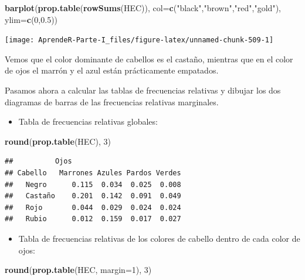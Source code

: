\documentclass[]{book}
\newenvironment{Shaded}{\begin{snugshade}}{\end{snugshade}}
\newcommand{\DataTypeTok}[1]{\textcolor[rgb]{0.13,0.29,0.53}{#1}}
\newcommand{\DecValTok}[1]{\textcolor[rgb]{0.00,0.00,0.81}{#1}}
\newcommand{\FloatTok}[1]{\textcolor[rgb]{0.00,0.00,0.81}{#1}}
\newcommand{\KeywordTok}[1]{\textcolor[rgb]{0.13,0.29,0.53}{\textbf{#1}}}
\newcommand{\NormalTok}[1]{#1}
\newcommand{\StringTok}[1]{\textcolor[rgb]{0.31,0.60,0.02}{#1}}
\providecommand{\tightlist}{%
  \setlength{\itemsep}{0pt}\setlength{\parskip}{0pt}}
\theoremstyle{definition}
\theoremstyle{definition}
\theoremstyle{definition}
\theoremstyle{remark}
\begin{document}
\begin{Shaded}
\begin{Highlighting}[]
\KeywordTok{barplot}\NormalTok{(}\KeywordTok{prop.table}\NormalTok{(}\KeywordTok{rowSums}\NormalTok{(HEC)),}
  \DataTypeTok{col=}\KeywordTok{c}\NormalTok{(}\StringTok{"black"}\NormalTok{,}\StringTok{"brown"}\NormalTok{,}\StringTok{"red"}\NormalTok{,}\StringTok{"gold"}\NormalTok{), }\DataTypeTok{ylim=}\KeywordTok{c}\NormalTok{(}\DecValTok{0}\NormalTok{,}\FloatTok{0.5}\NormalTok{))}
\end{Highlighting}
\end{Shaded}

\begin{center}\texttt{[image: AprendeR-Parte-I\_files/figure-latex/unnamed-chunk-509-1]} \end{center}

Vemos que el color dominante de cabellos es el castaño, mientras que en el color de ojos el marrón y el azul están prácticamente empatados.

Pasamos ahora a calcular las tablas de frecuencias relativas y dibujar los dos diagramas de barras de las frecuencias relativas marginales.

\begin{itemize}
\tightlist
\item
  Tabla de frecuencias relativas globales:
\end{itemize}

\begin{Shaded}
\begin{Highlighting}[]
\KeywordTok{round}\NormalTok{(}\KeywordTok{prop.table}\NormalTok{(HEC), }\DecValTok{3}\NormalTok{)  }
\end{Highlighting}
\end{Shaded}

\begin{verbatim}
##          Ojos
## Cabello   Marrones Azules Pardos Verdes
##   Negro      0.115  0.034  0.025  0.008
##   Castaño    0.201  0.142  0.091  0.049
##   Rojo       0.044  0.029  0.024  0.024
##   Rubio      0.012  0.159  0.017  0.027
\end{verbatim}

\begin{itemize}
\tightlist
\item
  Tabla de frecuencias relativas de los colores de cabello dentro de cada color de ojos:
\end{itemize}

\begin{Shaded}
\begin{Highlighting}[]
\KeywordTok{round}\NormalTok{(}\KeywordTok{prop.table}\NormalTok{(HEC, }\DataTypeTok{margin=}\DecValTok{1}\NormalTok{), }\DecValTok{3}\NormalTok{)  }
\end{Highlighting}
\end{Shaded}
\end{document}
